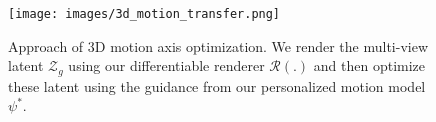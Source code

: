 \begin{figure}
\texttt{[image: images/3d\_motion\_transfer.png]}

\caption{Approach of 3D motion axis optimization. We render the multi-view latent $\mathcal{Z}_{g}$ using our differentiable renderer $\mathcal{R}(.)$ and then optimize these latent using the guidance from our personalized motion model $\psi^{*}$.}
\vspace{-3mm}
\label{fig:pipeline-3d-motion-transfer}
\end{figure}